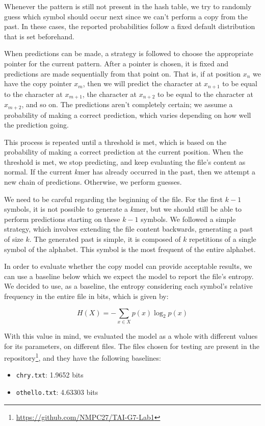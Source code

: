 \documentclass{article}
\begin{document}
Whenever the pattern is still not present in the hash table, we try to randomly guess which symbol should occur next since we can't perform a copy from the past.
In these cases, the reported probabilities follow a fixed default distribution that is set beforehand.

When predictions can be made, a strategy is followed to choose the appropriate pointer for the current pattern.
After a pointer is chosen, it is fixed and predictions are made sequentially from that point on.
That is, if at position $x_n$ we have the copy pointer $x_m$, then we will predict the character at $x_{n+1}$ to be equal to the character at $x_{m+1}$, the character at $x_{n+2}$ to be equal to the character at $x_{m+2}$, and so on.
The predictions aren't completely certain; we assume a probability of making a correct prediction, which varies depending on how well the prediction going.

This process is repeated until a threshold is met, which is based on the probability of making a correct prediction at the current position.
When the threshold is met, we stop predicting, and keep evaluating the file's content as normal.
If the current $k$mer has already occurred in the past, then we attempt a new chain of predictions.
Otherwise, we perform guesses.

We need to be careful regarding the beginning of the file.
For the first $k-1$ symbols, it is not possible to generate a $k$mer, but we should still be able to perform predictions starting on these $k-1$ symbols.
We followed a simple strategy, which involves extending the file content backwards, generating a past of size $k$.
The generated past is simple, it is composed of $k$ repetitions of a single symbol of the alphabet.
This symbol is the most frequent of the entire alphabet.

In order to evaluate whether the copy model can provide acceptable results, we can use a baseline below which we expect the model to report the file's entropy.
We decided to use, as a baseline, the entropy considering each symbol's relative frequency in the entire file in bits, which is given by:

$$
H(X) = - \sum_{x \in X}{p(x) \log_{2}{p(x)}}
$$

With this value in mind, we evaluated the model as a whole with different values for its parameters, on different files.
The files chosen for testing are present in the repository\footnote{\url{https://github.com/NMPC27/TAI-G7-Lab1}}, and they have the following baselines:
\begin{itemize}
    \item \verb|chry.txt|: 1.9652 bits
    \item \verb|othello.txt|: 4.63303 bits
\end{itemize}
\end{document}
